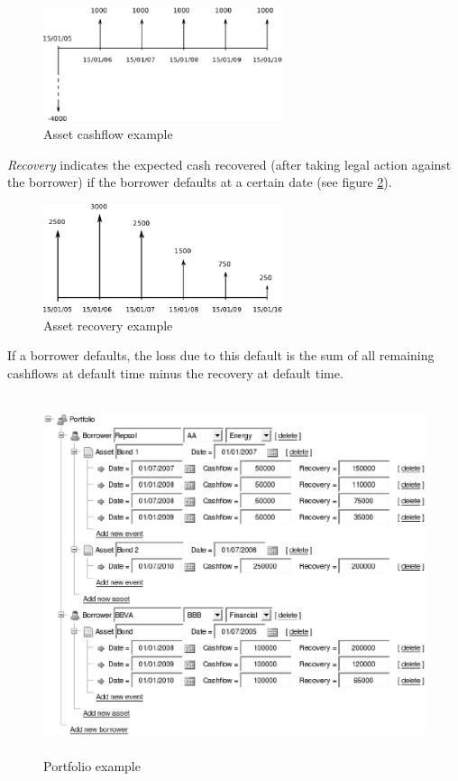 \documentclass[a4paper,12pt,final]{article}
\begin{document}
\begin{figure}[!hbt]
\begin{center}
\includegraphics[width=7cm, angle=0]{./images/cashflow.eps}
\caption{Asset cashflow example}
\label{cashflow}
\end{center}
\end{figure}
\FloatBarrier

\emph{Recovery} indicates the expected cash recovered (after taking legal action against 
the borrower) if the borrower defaults at a certain date (see figure \ref{recovery}).

\begin{figure}[!hbt]
\begin{center}
\includegraphics[width=7cm, angle=0]{./images/recovery.eps}
\caption{Asset recovery example}
\label{recovery}
\end{center}
\end{figure}
\FloatBarrier

If a borrower defaults, the loss due to this default is the sum of all remaining
cashflows at default time minus the recovery at default time.

\begin{figure}[!hbt]
\begin{center}
\includegraphics[height=10.5cm, angle=0]{./images/portfolio.eps}
\caption{Portfolio example}
\label{portfolio}
\end{center}
\end{figure}
\FloatBarrier
\end{document}
